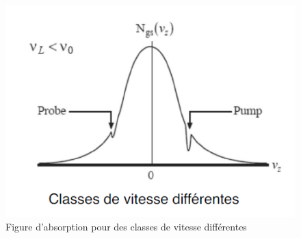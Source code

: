 \begin{figure}[tph]
    \centering
    \includegraphics[scale=1.0]{Images2/Vitesse2.PNG}
    \caption{Figure d'absorption pour des classes de vitesse différentes}
\label{fig:vit2}
\end{figure}


